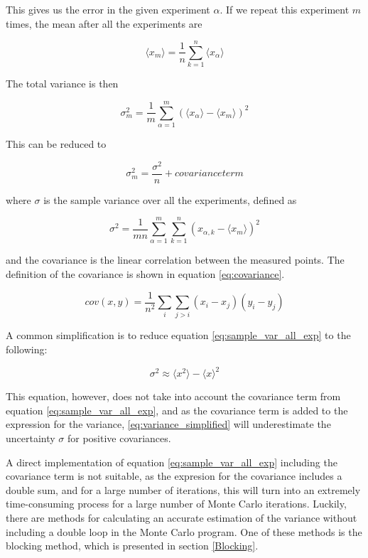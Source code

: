 \documentclass[norsk,a4paper,12pt]{article}
\begin{document}
This gives us the error in the given experiment $\alpha$. If we repeat this experiment $m$ times, the mean after all the experiments are

\begin{equation}
\label{eq:mean}
\langle x_{m} \rangle = \frac{1}{n} \sum_{k=1}^n  \langle x_{\alpha} \rangle
\end{equation}

The total variance is then

\begin{equation}
\sigma_m^2 = \frac{1}{m} \sum_{\alpha=1}^m ( \langle x_{\alpha} \rangle - \langle x_{m} \rangle )^2
\end{equation}

This can be reduced to 

\begin{equation}
\label{eq:sample_var_all_exp}
\sigma_m^2 = \frac{\sigma^2}{n} + covariance term
\end{equation}

where $\sigma$ is the sample variance over all the experiments, defined as 

\begin{equation}
\sigma^2 = \frac{1}{mn} \sum_{\alpha=1}^m \sum_{k=1}^n (x_{\alpha, k} - \langle x_m \rangle )^2
\end{equation}

and the covariance is the linear correlation between the measured points. The definition of the covariance is shown in equation \ref{eq:covariance}.

\begin{equation}
cov(x,y) = \frac{1}{n^2} \sum_i \sum_{j >i} (x_i - x_j) (y_i - y_j)
\end{equation}

A common simplification is to reduce equation \ref{eq:sample_var_all_exp} to the following:

\begin{equation}
\label{eq:variance_simplified}
\sigma^2 \approx \langle x^2 \rangle - \langle x \rangle^2
\end{equation}

This equation, however, does not take into account the covariance term from equation \ref{eq:sample_var_all_exp}, and as the covariance term is added to the expression for the variance, \ref{eq:variance_simplified} will underestimate the uncertainty $\sigma$ for positive covariances.

A direct implementation of equation \ref{eq:sample_var_all_exp} including the covariance term is not suitable, as the expresion for the covariance includes a double sum, and for a large number of iterations, this will turn into an extremely time-consuming process for a large number of Monte Carlo iterations. Luckily, there are methods for calculating an accurate estimation of the variance without including a double loop in the Monte Carlo program. One of these methods is the blocking method, which is presented in section \ref{Blocking}.
\end{document}
